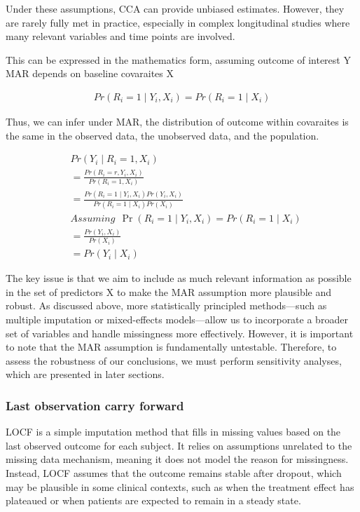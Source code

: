 \documentclass{article}
\begin{document}
Under these assumptions, CCA can provide unbiased estimates. However,
they are rarely fully met in practice, especially in complex
longitudinal studies where many relevant variables and time points are
involved.

This can be expressed in the mathematics form, assuming outcome of
interest Y MAR depends on baseline covaraites X

\begin{align*}
  Pr(R_i=1 \mid Y_i, X_i) = Pr(R_i=1 \mid X_i)
  \end{align*}

Thus, we can infer under MAR, the distribution of outcome within
covaraites is the same in the observed data, the unobserved data, and
the population.

\begin{align*}
  & Pr(Y_i \mid R_i=1, X_i) \\ 
  & = \displaystyle \frac{Pr(R_i=r,Y_i,X_i)}{Pr(R_i=1,X_i)} \\
  & = \displaystyle \frac{Pr(R_i=1 \mid Y_i,X_i)Pr(Y_i,X_i)}{Pr(R_i=1 \mid X_i)Pr(X_i)} 
  \\
  & Assuming \ \ \Pr(R_i=1 \mid Y_i, X_i) = Pr(R_i=1 \mid X_i) \\
  & = \displaystyle \frac{Pr(Y_i,X_i)}{Pr(X_i)} \\
  & = Pr(Y_i \mid X_i)
  \end{align*}

The key issue is that we aim to include as much relevant information as
possible in the set of predictors X to make the MAR assumption more
plausible and robust. As discussed above, more statistically principled
methods---such as multiple imputation or mixed-effects models---allow us
to incorporate a broader set of variables and handle missingness more
effectively. However, it is important to note that the MAR assumption is
fundamentally untestable. Therefore, to assess the robustness of our
conclusions, we must perform sensitivity analyses, which are presented
in later sections.

\subsubsection{Last observation carry
forward}\label{last-observation-carry-forward}

LOCF is a simple imputation method that fills in missing values based on
the last observed outcome for each subject. It relies on assumptions
unrelated to the missing data mechanism, meaning it does not model the
reason for missingness. Instead, LOCF assumes that the outcome remains
stable after dropout, which may be plausible in some clinical contexts,
such as when the treatment effect has plateaued or when patients are
expected to remain in a steady state.
\end{document}
